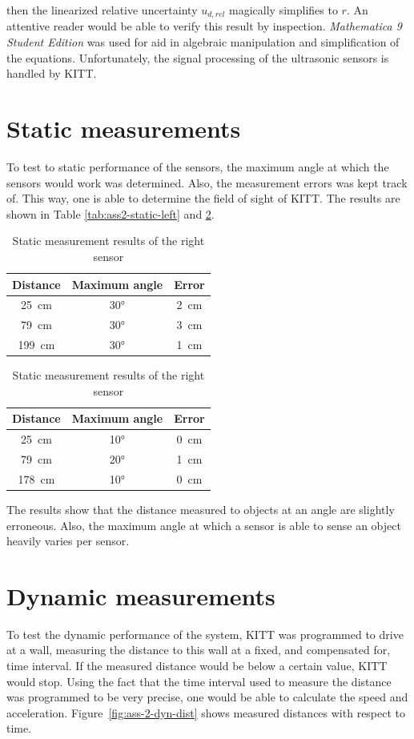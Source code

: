 \documentclass[11pt,titlepage]{report}
\begin{document}
then the linearized relative uncertainty $u_{d,rel}$ magically simplifies to $r$. An attentive reader would be able to verify this result by inspection. \textit{Mathematica 9 Student Edition} was used for aid in algebraic manipulation and simplification of the equations. Unfortunately, the signal processing of the ultrasonic sensors is handled by KITT.

\section{Static measurements}
To test to static performance of the sensors, the maximum angle at which the sensors would work was determined. Also, the measurement errors was kept track of. This way, one is able to determine the field of sight of KITT. The results are shown in Table \ref{tab:ass2-static-left} and \ref{tab:ass2-static-right}.
\begin{table}[H]
	\parbox{.45\linewidth}{
		\centering
		\caption{Static measurement results of the left sensor}
		\label{tab:ass2-static-left}
		\begin{tabular}{c c c}
			\hline\hline
			Distance & Maximum angle & Error \\
			\hline
			\SI{25}{cm} & \ang{30} & \SI{2}{cm} \\
			\SI{79}{cm} & \ang{30} & \SI{3}{cm} \\
			\SI{199}{cm} & \ang{30} & \SI{1}{cm} \\
			\hline
		\end{tabular}
	}
	\parbox{.45\linewidth}{
		\centering
		\caption{Static measurement results of the right sensor}
		\label{tab:ass2-static-right}
		\begin{tabular}{c c c}
			\hline\hline
			Distance & Maximum angle & Error \\
			\hline
			\SI{25}{cm} & \ang{10} & \SI{0}{cm} \\
			\SI{79}{cm} & \ang{20} & \SI{1}{cm} \\
			\SI{178}{cm} & \ang{10} & \SI{0}{cm} \\
			\hline
		\end{tabular}
	}
\end{table}

The results show that the distance measured to objects at an angle are slightly erroneous. Also, the maximum angle at which a sensor is able to sense an object heavily varies per sensor. 

\section{Dynamic measurements}
To test the dynamic performance of the system, KITT was programmed to drive at a wall, measuring the distance to this wall at a fixed, and compensated for, time interval. If the measured distance would be below a certain value, KITT would stop. Using the fact that the time interval used to measure the distance was programmed to be very precise, one would be able to calculate the speed and acceleration. Figure~\ref{fig:ass-2-dyn-dist} shows measured distances with respect to time.
\end{document}
